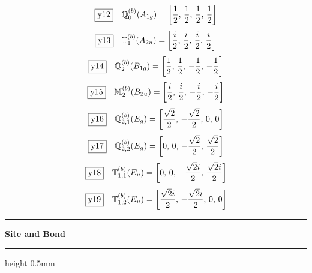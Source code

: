 \documentclass[fleqn,10pt,landscape]{jsarticle}
\begin{document}
\begin{dmath*}
\fbox{y12}\quad \mathbb{Q}_{0}^{(b)}(A_{1g})=\left[ \frac{1}{2},\, \frac{1}{2},\, \frac{1}{2},\, \frac{1}{2} \right]
\end{dmath*}
\begin{dmath*}
\fbox{y13}\quad \mathbb{T}_{1}^{(b)}(A_{2u})=\left[ \frac{i}{2},\, \frac{i}{2},\, \frac{i}{2},\, \frac{i}{2} \right]
\end{dmath*}
\begin{dmath*}
\fbox{y14}\quad \mathbb{Q}_{2}^{(b)}(B_{1g})=\left[ \frac{1}{2},\, \frac{1}{2},\, - \frac{1}{2},\, - \frac{1}{2} \right]
\end{dmath*}
\begin{dmath*}
\fbox{y15}\quad \mathbb{M}_{2}^{(b)}(B_{2u})=\left[ \frac{i}{2},\, \frac{i}{2},\, - \frac{i}{2},\, - \frac{i}{2} \right]
\end{dmath*}
\begin{dmath*}
\fbox{y16}\quad \mathbb{Q}_{2,1}^{(b)}(E_{g})=\left[ \frac{\sqrt{2}}{2},\, - \frac{\sqrt{2}}{2},\, 0,\, 0 \right]
\end{dmath*}
\begin{dmath*}
\fbox{y17}\quad \mathbb{Q}_{2,2}^{(b)}(E_{g})=\left[ 0,\, 0,\, - \frac{\sqrt{2}}{2},\, \frac{\sqrt{2}}{2} \right]
\end{dmath*}
\begin{dmath*}
\fbox{y18}\quad \mathbb{T}_{1,1}^{(b)}(E_{u})=\left[ 0,\, 0,\, - \frac{\sqrt{2} i}{2},\, \frac{\sqrt{2} i}{2} \right]
\end{dmath*}
\begin{dmath*}
\fbox{y19}\quad \mathbb{T}_{1,2}^{(b)}(E_{u})=\left[ \frac{\sqrt{2} i}{2},\, - \frac{\sqrt{2} i}{2},\, 0,\, 0 \right]
\end{dmath*}
\vspace{5mm}
\noindent \rule[0.5mm]{5mm}{0.5mm}\hspace{3mm}\textbf{Site and Bond}\hspace{3mm}\leaders\hrule height 0.5mm\hfill\kern0pt
\vspace{3mm}
\end{document}
